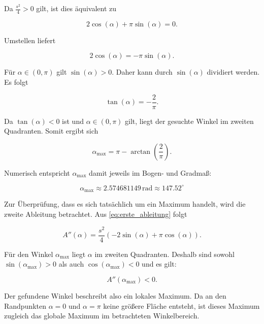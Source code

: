 Da \(\frac{s^2}{4}>0\) gilt, ist dies äquivalent zu

\begin{equation}
    2\cos(\alpha)
    +
    \pi\sin(\alpha)
    =
    0.
\end{equation}

Umstellen liefert

\begin{equation}
    2\cos(\alpha)
    =
    -\pi\sin(\alpha).
\end{equation}

Für \(\alpha\in(0,\pi)\) gilt \(\sin(\alpha)>0\). Daher kann durch
\(\sin(\alpha)\) dividiert werden. Es folgt

\begin{equation}
    \tan(\alpha)
    =
    -\frac{2}{\pi}.
\end{equation}

Da \(\tan(\alpha)<0\) ist und \(\alpha\in(0,\pi)\) gilt, liegt der gesuchte
Winkel im zweiten Quadranten. Somit ergibt sich

\begin{equation}
    \alpha_{\max}
    =
    \pi
    -
    \arctan\left(\frac{2}{\pi}\right).
    \label{eq:alpha_max}
\end{equation}

Numerisch entspricht $\alpha_{\max}$ damit jeweils im Bogen- und Gradmaß:

\begin{equation}
    \alpha_{\max}
    \approx
    2.574681149\,\mathrm{rad} 
    \approx
    147.52^\circ
\end{equation}

Zur Überprüfung, dass es sich tatsächlich um ein Maximum handelt, wird die
zweite Ableitung betrachtet. Aus \eqref{eq:erste_ableitung} folgt

\begin{equation}
    A''(\alpha)
    =
    \frac{s^2}{4}
    \left(
        -2\sin(\alpha)
        +
        \pi\cos(\alpha)
    \right).
\end{equation}

Für den Winkel \(\alpha_{\max}\) liegt \(\alpha\) im zweiten Quadranten.
Deshalb sind sowohl \(\sin(\alpha_{\max})>0\) als auch \(\cos(\alpha_{\max})<0\) und es gilt:

\begin{equation}
    A''(\alpha_{\max})<0.
\end{equation}

Der gefundene Winkel beschreibt also ein lokales Maximum. Da an den
Randpunkten \(\alpha=0\) und \(\alpha=\pi\) keine größere Fläche entsteht,
ist dieses Maximum zugleich das globale Maximum im betrachteten
Winkelbereich.

